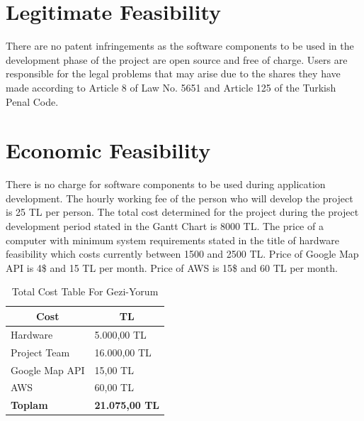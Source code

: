 \section{Legitimate Feasibility}
There are no patent infringements as the software components to be used in the development phase of the project are open source and free of charge. Users are responsible for the legal problems that may arise due to the shares they have made according to Article 8 of Law No. 5651 and Article 125 of the Turkish Penal Code.


\section{Economic Feasibility}
There is no charge for software components to be used during application development. The hourly working fee of the person who will develop the project is 25 TL per person. The total cost determined for the project during the project development period stated in the Gantt Chart is 8000 TL. The price of a computer with minimum system requirements stated in the title of hardware feasibility which costs currently between 1500 and 2500 TL. Price of Google Map API is 4\$ and 15 TL per month. Price of AWS is 15\$ and 60 TL per month.

\begin{table}[]
\centering
\caption{Total Cost Table For Gezi-Yorum}
\label{my-label}
\begin{tabular}{|l|l|}
\hline
\multicolumn{1}{|c|}{\textbf{Cost}} & \multicolumn{1}{c|}{\textbf{TL}} \\ \hline
Hardware                               & 5.000,00 TL                      \\ \hline
Project Team                           & 16.000,00 TL                      \\ \hline
Google Map API                         & 15,00 TL                      \\ \hline
AWS                                 & 60,00 TL                      \\ \hline
\textbf{Toplam}                        & \textbf{21.075,00 TL}            \\ \hline
\end{tabular}
\end{table}




